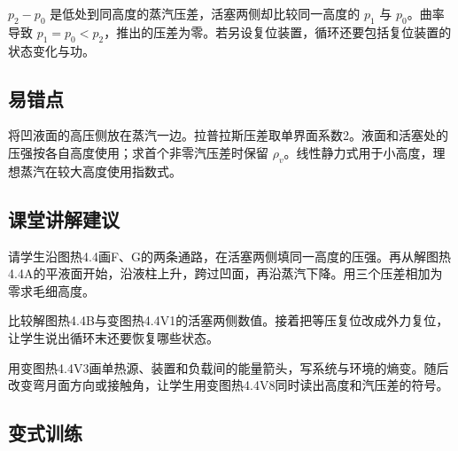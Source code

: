 \documentclass[UTF8,fontset=fandol,a4paper,11pt]{ctexart}
\begin{document}
$p_2-p_0$ 是低处到同高度的蒸汽压差，活塞两侧却比较同一高度的 $p_1$ 与 $p_0$。曲率导致 $p_1=p_0<p_2$，推出的压差为零。若另设复位装置，循环还要包括复位装置的状态变化与功。



\subsection*{易错点}

将凹液面的高压侧放在蒸汽一边。拉普拉斯压差取单界面系数2。液面和活塞处的压强按各自高度使用；求首个非零汽压差时保留 $\rho_v$。线性静力式用于小高度，理想蒸汽在较大高度使用指数式。



\subsection*{课堂讲解建议}

请学生沿图热4.4画F、G的两条通路，在活塞两侧填同一高度的压强。再从解图热4.4A的平液面开始，沿液柱上升，跨过凹面，再沿蒸汽下降。用三个压差相加为零求毛细高度。

比较解图热4.4B与变图热4.4V1的活塞两侧数值。接着把等压复位改成外力复位，让学生说出循环末还要恢复哪些状态。

用变图热4.4V3画单热源、装置和负载间的能量箭头，写系统与环境的熵变。随后改变弯月面方向或接触角，让学生用变图热4.4V8同时读出高度和汽压差的符号。



\subsection*{变式训练}
\end{document}
